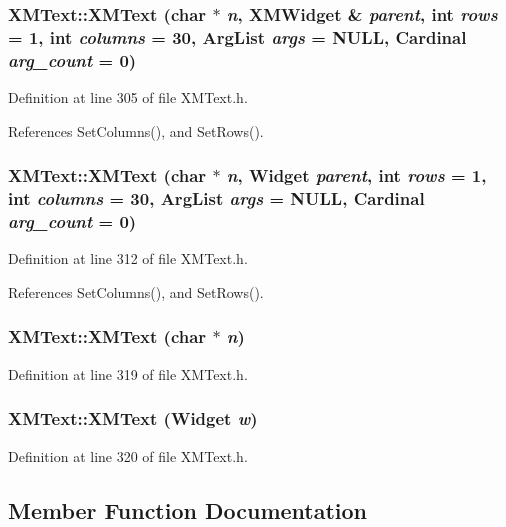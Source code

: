 \subsubsection{\setlength{\rightskip}{0pt plus 5cm}XMText::XMText (char $\ast$ {\em n}, {\bf XMWidget} \& {\em parent}, int {\em rows} = 1, int {\em columns} = 30, Arg\-List {\em args} = NULL, Cardinal {\em arg\_\-count} = 0)\hspace{0.3cm}{\tt  [inline]}}\label{classXMText_a0}




Definition at line 305 of file XMText.h.

References Set\-Columns(), and Set\-Rows().
\subsubsection{\setlength{\rightskip}{0pt plus 5cm}XMText::XMText (char $\ast$ {\em n}, Widget {\em parent}, int {\em rows} = 1, int {\em columns} = 30, Arg\-List {\em args} = NULL, Cardinal {\em arg\_\-count} = 0)\hspace{0.3cm}{\tt  [inline]}}\label{classXMText_a1}




Definition at line 312 of file XMText.h.

References Set\-Columns(), and Set\-Rows().
\subsubsection{\setlength{\rightskip}{0pt plus 5cm}XMText::XMText (char $\ast$ {\em n})\hspace{0.3cm}{\tt  [inline]}}\label{classXMText_a2}




Definition at line 319 of file XMText.h.
\subsubsection{\setlength{\rightskip}{0pt plus 5cm}XMText::XMText (Widget {\em w})\hspace{0.3cm}{\tt  [inline]}}\label{classXMText_a3}




Definition at line 320 of file XMText.h.

\subsection{Member Function Documentation}
